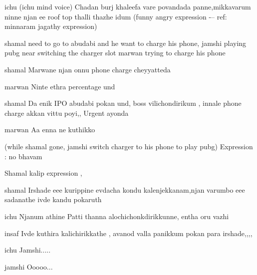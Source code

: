 \documentclass{screenplay}[2012/06/30]
\begin{document}
\begin{dialogue}{ichu}
(ichu mind voice)
Chadan burj khaleefa vare povandada panne,mikkavarum ninne njan ee roof top thalli thazhe idum
(funny angry expression -– ref: minnaram jagathy expression)
\end{dialogue}


shamal need to go to abudabi and he want to charge his phone, jamshi playing pubg  near switching the charger slot
marwan trying to charge his phone
\begin{dialogue}{shamal}
Marwane njan onnu phone charge cheyyatteda
\end{dialogue}

\begin{dialogue}{marwan}
Ninte ethra percentage und
\end{dialogue}

\begin{dialogue}{shamal}
Da enik IPO abudabi pokan und, boss vilichondirikum , innale phone charge akkan vittu poyi,,
Urgent ayonda
\end{dialogue}

\begin{dialogue}{marwan}
Aa enna ne kuthikko
\end{dialogue}

(while shamal gone, jamshi switch charger to his phone to play pubg)
Expression : no bhavam

Shamal kalip expression ,

\begin{dialogue}{shamal}
Irshade eee kurippine evdacha kondu kalenjekkanam,njan varumbo eee sadanathe ivde kandu pokaruth
\end{dialogue}

\begin{dialogue}{ichu}
Njanum athine Patti thanna alochichonkdirikkunne, entha oru vazhi

\end{dialogue}

\begin{dialogue}{insaf}
Ivde kuthira kalichirikkathe , avanod valla panikkum pokan para irshade,,,, 
\end{dialogue}


\begin{dialogue}{ichu}
Jamshi.....
\end{dialogue}

\begin{dialogue}{jamshi}
Ooooo...
\end{dialogue}
\end{document}

